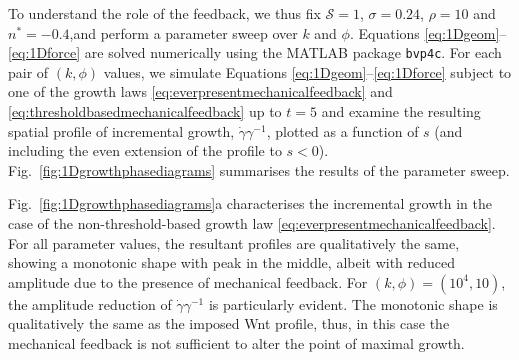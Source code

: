 To understand the role of the feedback, we thus fix $\mathcal{S} = 1$, $\sigma = 0.24$, $\rho = 10$ and $n^* = -0.4$,and perform a parameter sweep over $k$ and $\phi$. Equations \eqref{eq:1Dgeom}--\eqref{eq:1Dforce} are solved numerically using the MATLAB package \texttt{bvp4c}. For each pair of $(k, \phi)$ values, we simulate Equations \eqref{eq:1Dgeom}--\eqref{eq:1Dforce} subject to one of the growth laws \eqref{eq:everpresentmechanicalfeedback} and \eqref{eq:thresholdbasedmechanicalfeedback} up to $t = 5$ and examine the resulting spatial profile of incremental growth, $\dot{\gamma}\gamma^{-1}$, plotted as a function of $s$ (and including the even extension of the profile to $s<0$). Fig.\ \ref{fig:1Dgrowthphasediagrams} summarises the results of the parameter sweep. 

Fig.\ \ref{fig:1Dgrowthphasediagrams}a characterises the incremental growth in the case of the non-threshold-based growth law \eqref{eq:everpresentmechanicalfeedback}. For all parameter values, the resultant profiles are qualitatively the same, showing a monotonic shape with peak in the middle, albeit with reduced amplitude due to the presence of mechanical feedback. For $(k, \phi) = (10^4, 10)$, the amplitude reduction of $\dot\gamma\gamma^{-1}$ is particularly evident. The monotonic shape is qualitatively the same as the imposed Wnt profile, thus, in this case the mechanical feedback is not sufficient to alter the point of maximal growth.

